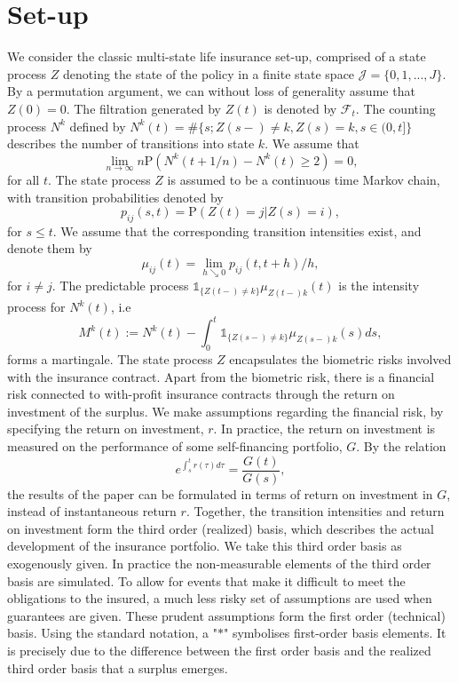 \documentclass[12pt]{article}
\newcommand{\indic}[1]{\mathds{1}_{ \{ #1 \} }}
\renewcommand{\P}{\text{P}}
\theoremstyle{my_thm}
\theoremstyle{my_rem}
\newenvironment{remark}
  {\pushQED{\qed}\renewcommand{\qedsymbol}{$\triangle$}\remarkex}
  {\popQED\endremarkex}
\begin{document}
\section{Set-up} \label{sec:Set_1}
We consider the classic multi-state life insurance set-up, comprised of a state process $Z$ denoting the state of the policy in a finite state space $\mathcal{J}=\{0,1,...,J\}$. By a permutation argument, we can without loss of generality assume that $Z(0)=0$. The filtration generated by $Z(t)$ is denoted by $\mathcal{F}_t$. The counting process $N^{k}$ defined by $N^{k}(t)=\# \{ s; Z(s-) \neq k, Z(s)=k, s \in (0,t] \}$ describes the number of transitions into state $k$. We assume that 
\begin{equation}
\lim_{n \rightarrow \infty} n \P( N^k(t+1/n) - N^k(t) \geq 2)=0, \label{eq:AAW}
\end{equation}
for all $t$. The state process $Z$ is assumed to be a continuous time Markov chain, with transition probabilities denoted by
$$
p_{ij}(s,t)= \P(Z(t)=j|Z(s)=i),
$$
for $s\leq t$. We assume that the corresponding transition intensities exist, and denote them by
$$
\mu_{ij}(t)=\lim_{h \searrow 0} p_{ij}(t,t+h)/h,
$$
for $i \neq j$. The predictable process $ \indic{Z(t-)\neq k }\mu_{Z(t-)k}(t)$ is the intensity process for $N^{k}(t)$, i.e
$$
M^{k}(t):=N^k(t)-\int_0^t \indic{Z(s-)\neq k } \mu_{Z(s-)k}(s) ds,
$$
forms a martingale. The state process $Z$ encapsulates the biometric risks involved with the insurance contract. Apart from the biometric risk, there is a financial risk connected to with-profit insurance contracts through the return on investment of the surplus. We make assumptions regarding the financial risk, by specifying the return on investment, $r$. 
\begin{remark}[Portfolio investment]
In practice, the return on investment is measured on the performance of some self-financing portfolio, $G$. By the relation
$$
e^{\int_s^t r(\tau) d\tau} = \frac{G(t)}{G(s)},
$$
the results of the paper can be formulated in terms of return on investment in $G$, instead of instantaneous return $r$.
\end{remark}
\noindent
Together, the transition intensities and return on investment form the third order (realized) basis, which describes the actual development of the insurance portfolio. We take this third order basis as exogenously given. In practice the non-measurable elements of the third order basis are simulated. To allow for events that make it difficult to meet the obligations to the insured, a much less risky set of assumptions are used when guarantees are given. These prudent assumptions form the first order (technical) basis. Using the standard notation, a "$*$" symbolises first-order basis elements. It is precisely due to the difference between the first order basis and the realized third order basis that a surplus emerges.
\end{document}
